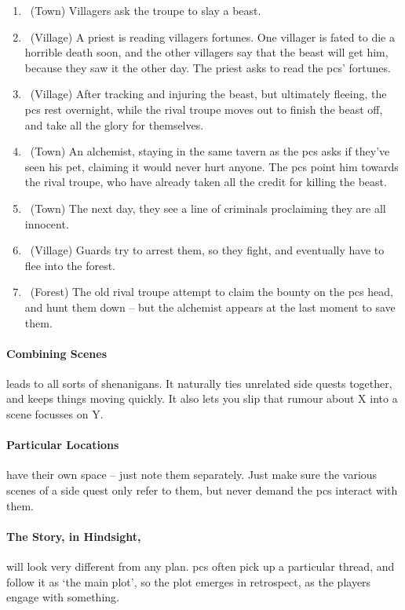 \begin{multicols}{2}
\begin{enumerate}
  \item
  \sqr~(Town)
  Villagers ask the troupe to slay a beast.
  \item
  \sqr~(Village)
  A priest is reading villagers fortunes.
  One villager is fated to die a horrible death soon, and the other villagers say that the beast will get him, because they saw it the other day.
  The priest asks to read the \glspl{pc}' fortunes.
  \item
  \sqr~(Village)
  After tracking and injuring the beast, but ultimately fleeing, the \glspl{pc} rest overnight, while the rival troupe moves out to finish the beast off, and take all the glory for themselves.
  \item
  \sqr~(Town)
  An alchemist, staying in the same tavern as the \glspl{pc} asks if they've seen his pet, claiming it would never hurt anyone.
  The \glspl{pc} point him towards the rival troupe, who have already taken all the credit for killing the beast.
  \item
  \sqr~(Town)
  The next day, they see a line of criminals proclaiming they are all innocent.
  \item
  \sqr~(Village)
  Guards try to arrest them, so they fight, and eventually have to flee into the forest.
  \item
  \sqn~(Forest)
  The old rival troupe attempt to claim the bounty on the \glspl{pc} head, and hunt them down -- but the alchemist appears at the last moment to save them.

\end{enumerate}

\paragraph{Combining Scenes}
leads to all sorts of shenanigans.
It naturally ties unrelated side quests together, and keeps things moving quickly.
It also lets you slip that rumour about X into a scene focusses on Y.

\paragraph{Particular Locations}
have their own space -- just note them separately.
Just make sure the various scenes of a side quest only refer to them, but never demand the \glspl{pc} interact with them.

\paragraph{The Story, in Hindsight,}
will look very different from any plan.
\Glspl{pc} often pick up a particular thread, and follow it as `the main plot', so the plot emerges in retrospect, as the players engage with something.


\end{multicols}

